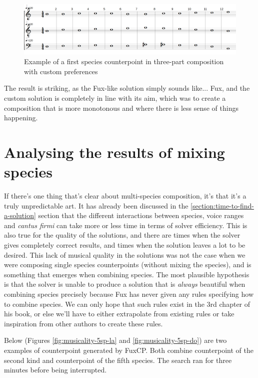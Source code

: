 \begin{figure}[h]
    \centering
    \includegraphics[width=1\textwidth]{Images/Musicality/musicality-1sp-custom-pref.png}
    \caption{Example of a first species counterpoint in three-part composition with custom preferences}
    \label{fig:musicality-1sp-custom}
\end{figure}

The result is striking, as the Fux-like solution simply sounds like... Fux, and the custom solution is completely in line with its aim, which was to create a composition that is more monotonous and where there is less sense of things happening.

\section{Analysing the results of mixing species}
If there's one thing that's clear about multi-species composition, it's that it's a truly unpredictable art. It has already been discussed in the \ref{section:time-to-find-a-solution} section that the different interactions between species, voice ranges and \textit{cantus firmi} can take more or less time in terms of solver efficiency. This is also true for the quality of the solutions, and there are times when the solver gives completely correct results, and times when the solution leaves a lot to be desired. This lack of musical quality in the solutions was not the case when we were composing single species counterpoints (without mixing the species), and is something that emerges when combining species. The most plausible hypothesis is that the solver is unable to produce a solution that is \textit{always} beautiful when combining species precisely because Fux has never given any rules specifying how to combine species. We can only hope that such rules exist in the 3rd chapter of his book, or else we'll have to either extrapolate from existing rules or take inspiration from other authors to create these rules.

Below (Figures \ref{fig:musicality-5sp-la} and \ref{fig:musicality-5sp-do}) are two examples of counterpoint generated by FuxCP. Both combine counterpoint of the second kind and counterpoint of the fifth species. The search ran for three minutes before being interrupted.

